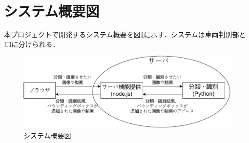 \section{システム概要図}
本プロジェクトで開発するシステム概要を図\ref{FIG}に示す．システムは車両判別部とUIに分けられる．

\begin{figure}
	\centering
	\includegraphics [width=\linewidth]{chap2/fig/sys_gaiyou5.pdf}
	\caption{システム概要図}
	\label{FIG}
\end{figure}








